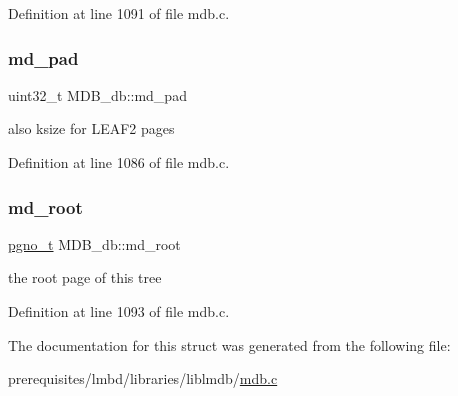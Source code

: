 Definition at line 1091 of file mdb.\+c.

\mbox{\label{struct_m_d_b__db_a01ca7b28ab02c79ba76b64b32f23cc9a}} 
\subsubsection{\texorpdfstring{md\+\_\+pad}{md\_pad}}
{\footnotesize\ttfamily uint32\+\_\+t M\+D\+B\+\_\+db\+::md\+\_\+pad}

also ksize for L\+E\+A\+F2 pages 

Definition at line 1086 of file mdb.\+c.

\mbox{\label{struct_m_d_b__db_aa082a24262d25759cfbcf69a537f859a}} 
\subsubsection{\texorpdfstring{md\+\_\+root}{md\_root}}
{\footnotesize\ttfamily \mbox{\hyperlink{group__internal_gadb65f0424c9d3827bf6409087ad555cd}{pgno\+\_\+t}} M\+D\+B\+\_\+db\+::md\+\_\+root}

the root page of this tree 

Definition at line 1093 of file mdb.\+c.



The documentation for this struct was generated from the following file\+:\begin{DoxyCompactItemize}
\item 
prerequisites/lmbd/libraries/liblmdb/\mbox{\hyperlink{mdb_8c}{mdb.\+c}}\end{DoxyCompactItemize}
